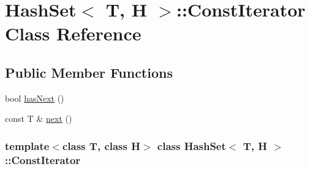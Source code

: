 \hypertarget{class_hash_set_1_1_const_iterator}{
\section{HashSet$<$ T, H $>$::ConstIterator Class Reference}
\label{class_hash_set_1_1_const_iterator}
}
\subsection*{Public Member Functions}
\begin{DoxyCompactItemize}
\item 
bool \hyperlink{class_hash_set_1_1_const_iterator_a98f56d50145e4c49584be45e7d1edaa1}{hasNext} ()
\item 
const T \& \hyperlink{class_hash_set_1_1_const_iterator_aa75d1ba093144424aff513f51eb76b60}{next} ()
\end{DoxyCompactItemize}
\subsubsection*{template$<$class T, class H$>$ class HashSet$<$ T, H $>$::ConstIterator}



